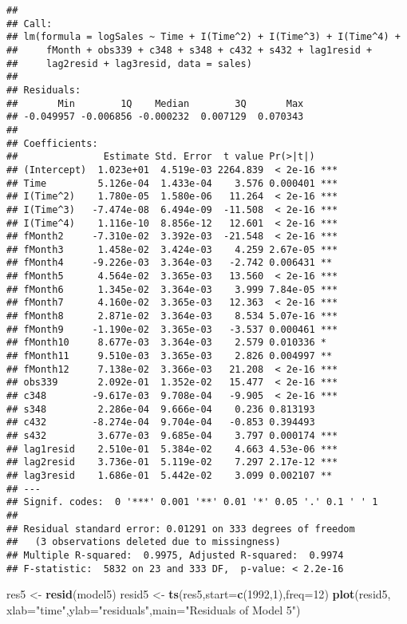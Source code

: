 \documentclass[
]{article}
\newenvironment{Shaded}{\begin{snugshade}}{\end{snugshade}}
\newcommand{\AttributeTok}[1]{\textcolor[rgb]{0.13,0.29,0.53}{#1}}
\newcommand{\DecValTok}[1]{\textcolor[rgb]{0.00,0.00,0.81}{#1}}
\newcommand{\FunctionTok}[1]{\textcolor[rgb]{0.13,0.29,0.53}{\textbf{#1}}}
\newcommand{\NormalTok}[1]{#1}
\newcommand{\OtherTok}[1]{\textcolor[rgb]{0.56,0.35,0.01}{#1}}
\newcommand{\StringTok}[1]{\textcolor[rgb]{0.31,0.60,0.02}{#1}}
\begin{document}
\begin{verbatim}
## 
## Call:
## lm(formula = logSales ~ Time + I(Time^2) + I(Time^3) + I(Time^4) + 
##     fMonth + obs339 + c348 + s348 + c432 + s432 + lag1resid + 
##     lag2resid + lag3resid, data = sales)
## 
## Residuals:
##       Min        1Q    Median        3Q       Max 
## -0.049957 -0.006856 -0.000232  0.007129  0.070343 
## 
## Coefficients:
##               Estimate Std. Error  t value Pr(>|t|)    
## (Intercept)  1.023e+01  4.519e-03 2264.839  < 2e-16 ***
## Time         5.126e-04  1.433e-04    3.576 0.000401 ***
## I(Time^2)    1.780e-05  1.580e-06   11.264  < 2e-16 ***
## I(Time^3)   -7.474e-08  6.494e-09  -11.508  < 2e-16 ***
## I(Time^4)    1.116e-10  8.856e-12   12.601  < 2e-16 ***
## fMonth2     -7.310e-02  3.392e-03  -21.548  < 2e-16 ***
## fMonth3      1.458e-02  3.424e-03    4.259 2.67e-05 ***
## fMonth4     -9.226e-03  3.364e-03   -2.742 0.006431 ** 
## fMonth5      4.564e-02  3.365e-03   13.560  < 2e-16 ***
## fMonth6      1.345e-02  3.364e-03    3.999 7.84e-05 ***
## fMonth7      4.160e-02  3.365e-03   12.363  < 2e-16 ***
## fMonth8      2.871e-02  3.364e-03    8.534 5.07e-16 ***
## fMonth9     -1.190e-02  3.365e-03   -3.537 0.000461 ***
## fMonth10     8.677e-03  3.364e-03    2.579 0.010336 *  
## fMonth11     9.510e-03  3.365e-03    2.826 0.004997 ** 
## fMonth12     7.138e-02  3.366e-03   21.208  < 2e-16 ***
## obs339       2.092e-01  1.352e-02   15.477  < 2e-16 ***
## c348        -9.617e-03  9.708e-04   -9.905  < 2e-16 ***
## s348         2.286e-04  9.666e-04    0.236 0.813193    
## c432        -8.274e-04  9.704e-04   -0.853 0.394493    
## s432         3.677e-03  9.685e-04    3.797 0.000174 ***
## lag1resid    2.510e-01  5.384e-02    4.663 4.53e-06 ***
## lag2resid    3.736e-01  5.119e-02    7.297 2.17e-12 ***
## lag3resid    1.686e-01  5.442e-02    3.099 0.002107 ** 
## ---
## Signif. codes:  0 '***' 0.001 '**' 0.01 '*' 0.05 '.' 0.1 ' ' 1
## 
## Residual standard error: 0.01291 on 333 degrees of freedom
##   (3 observations deleted due to missingness)
## Multiple R-squared:  0.9975, Adjusted R-squared:  0.9974 
## F-statistic:  5832 on 23 and 333 DF,  p-value: < 2.2e-16
\end{verbatim}

\begin{Shaded}
\begin{Highlighting}[]
\NormalTok{res5 }\OtherTok{\textless{}{-}} \FunctionTok{resid}\NormalTok{(model5)}
\NormalTok{resid5 }\OtherTok{\textless{}{-}} \FunctionTok{ts}\NormalTok{(res5,}\AttributeTok{start=}\FunctionTok{c}\NormalTok{(}\DecValTok{1992}\NormalTok{,}\DecValTok{1}\NormalTok{),}\AttributeTok{freq=}\DecValTok{12}\NormalTok{)}
\FunctionTok{plot}\NormalTok{(resid5, }\AttributeTok{xlab=}\StringTok{"time"}\NormalTok{,}\AttributeTok{ylab=}\StringTok{"residuals"}\NormalTok{,}\AttributeTok{main=}\StringTok{"Residuals of Model 5"}\NormalTok{)}
\end{Highlighting}
\end{Shaded}
\end{document}
